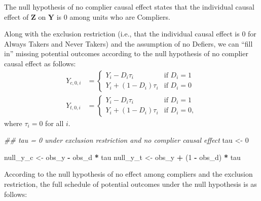 \documentclass[12pt,leqno]{article}
\newenvironment{Shaded}{\begin{snugshade}}{\end{snugshade}}
\newcommand{\CommentTok}[1]{\textcolor[rgb]{0.56,0.35,0.01}{\textit{#1}}}
\newcommand{\DecValTok}[1]{\textcolor[rgb]{0.00,0.00,0.81}{#1}}
\newcommand{\NormalTok}[1]{#1}
\newcommand{\OperatorTok}[1]{\textcolor[rgb]{0.81,0.36,0.00}{\textbf{#1}}}
\newcommand{\StringTok}[1]{\textcolor[rgb]{0.31,0.60,0.02}{#1}}
\theoremstyle{newstyle}
\begin{document}
The null hypothesis of no complier causal effect states that the
individual causal effect of \(\mathbf{Z}\) on \(\mathbf{Y}\) is \(0\)
among units who are Compliers.

Along with the exclusion restriction (i.e., that the individual causal
effect is \(0\) for Always Takers and Never Takers) and the assumption
of no Defiers, we can ``fill in'' missing potential outcomes according
to the null hypothesis of no complier causal effect as follows:
\begin{align*}
Y_{c,0,i} & = 
\begin{cases}
Y_i - D_i \tau_i & \text{if } D_i = 1 \\
Y_i + \left(1 - D_i\right) \tau_i & \text{if } D_i = 0
\end{cases} \\
Y_{t,0,i} & = 
\begin{cases}
Y_i - D_i \tau_i & \text{if } D_i = 1 \\
Y_i + \left(1 - D_i\right) \tau_i & \text{if } D_i = 0,
\end{cases}
\end{align*} where \(\tau_i = 0\) for all \(i\).

\begin{Shaded}
\begin{Highlighting}[]
\CommentTok{\#\# tau = 0 under exclusion restriction and no complier causal effect}
\NormalTok{tau \textless{}{-}}\StringTok{ }\DecValTok{0}

\NormalTok{null\_y\_c \textless{}{-}}\StringTok{ }\NormalTok{obs\_y }\OperatorTok{{-}}\StringTok{ }\NormalTok{obs\_d }\OperatorTok{*}\StringTok{ }\NormalTok{tau}
\NormalTok{null\_y\_t \textless{}{-}}\StringTok{ }\NormalTok{obs\_y }\OperatorTok{+}\StringTok{ }\NormalTok{(}\DecValTok{1} \OperatorTok{{-}}\StringTok{ }\NormalTok{obs\_d) }\OperatorTok{*}\StringTok{ }\NormalTok{tau}
\end{Highlighting}
\end{Shaded}

According to the null hypothesis of no effect among compliers and the
exclusion restriction, the full schedule of potential outcomes under the
null hypothesis is as follows:
\end{document}
